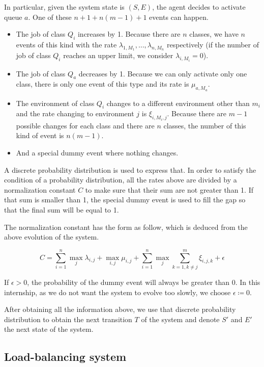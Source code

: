 \documentclass[
  a4paper, xcolor = usenames,dvipsnames]{article}
\providecommand{\tightlist}{%
  \setlength{\itemsep}{0pt}\setlength{\parskip}{0pt}}
\theoremstyle{definition}
\theoremstyle{definition}
\theoremstyle{definition}
\theoremstyle{definition}
\theoremstyle{remark}
\begin{document}
In particular, given the system state is \((S, E)\), the agent decides to activate queue \(a\). One of these \(n + 1 + n(m - 1) + 1\) events can happen.

\begin{itemize}
\tightlist
\item
  The job of class \(Q_{i}\) increases by 1. Because there are \(n\) classes, we have \(n\) events of this kind with the rate \(\lambda_{1, M_{1}}, \dots, \lambda_{n, M_{n}}\) respectively (if the number of job of class \(Q_{i}\) reaches an upper limit, we consider \(\lambda_{i, M_{i}} = 0\)).
\item
  The job of class \(Q_{a}\) decreases by 1. Because we can only activate only one class, there is only one event of this type and its rate is \(\mu_{a, M_{a}}\).
\item
  The environment of class \(Q_{i}\) changes to a different environment other than \(m_{i}\) and the rate changing to environment \(j\) is \(\xi_{i, M_{i}, j}\). Because there are \(m - 1\) possible changes for each class and there are \(n\) classes, the number of this kind of event is \(n(m - 1)\).
\item
  And a special dummy event where nothing changes.
\end{itemize}

A discrete probability distribution is used to express that. In order to satisfy the condition of a probability distribution, all the rates above are divided by a normalization constant \(C\) to make sure that their sum are not greater than 1. If that sum is smaller than 1, the special dummy event is used to fill the gap so that the final sum will be equal to 1.

The normalization constant has the form as follow, which is deduced from the above evolution of the system.

\[
C = \sum_{i = 1}^{n} \max_{j} \lambda_{i, j} + \max_{i, j} \mu_{i, j} + \sum_{i = 1}^{n} \max_{j} \sum_{k = 1, k \neq j}^{m} \xi_{i, j, k} + \epsilon
\]

If \(\epsilon > 0\), the probability of the dummy event will always be greater than 0. In this internship, as we do not want the system to evolve too slowly, we choose \(\epsilon \coloneq 0\).

After obtaining all the information above, we use that discrete probability distribution to obtain the next transition \(T\) of the system and denote \(S'\) and \(E'\) the next state of the system.

\hypertarget{load-balancing-system}{%
\subsection{Load-balancing system}\label{load-balancing-system}}
\end{document}
